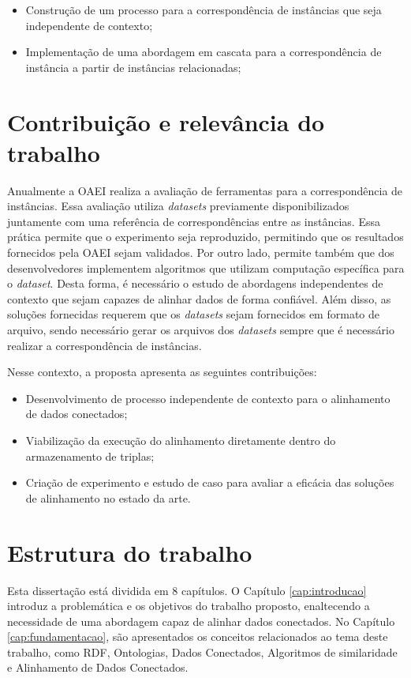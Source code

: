 \begin{itemize}
        \item Construção de um processo para a correspondência de instâncias que seja independente de contexto;
        \item Implementação de uma abordagem em cascata para a correspondência de instância a partir de instâncias relacionadas;
\end{itemize}


\section{Contribuição e relevância do trabalho}
\label{contribuicao}
Anualmente a OAEI realiza a avaliação de ferramentas para a correspondência de instâncias. Essa avaliação utiliza \textit{datasets} previamente disponibilizados juntamente com uma referência de correspondências entre as instâncias. Essa prática permite que o experimento seja reproduzido, permitindo que os resultados fornecidos pela OAEI sejam validados. Por outro lado, permite também que dos desenvolvedores implementem algoritmos que utilizam computação específica para o \textit{dataset}. Desta forma, é necessário o estudo de abordagens independentes de contexto que sejam capazes de alinhar dados de forma confiável. Além disso, as soluções fornecidas requerem que os \textit{datasets} sejam fornecidos em formato de arquivo, sendo necessário gerar os arquivos dos \textit{datasets} sempre que é necessário realizar a correspondência de instâncias.

Nesse contexto, a proposta apresenta as seguintes contribuições:
\begin{itemize}
\item Desenvolvimento de processo independente de contexto para o alinhamento de dados conectados;
\item Viabilização da execução do alinhamento diretamente dentro do armazenamento de triplas;%
\item  Criação de experimento e estudo de caso para avaliar a eficácia das soluções de alinhamento no estado da arte.
\end{itemize}

\section{Estrutura do trabalho}

Esta dissertação está dividida em 8 capítulos. O Capítulo \ref{cap:introducao} introduz a problemática e os objetivos do trabalho proposto, enaltecendo a necessidade de uma abordagem capaz de alinhar dados conectados. No Capítulo \ref{cap:fundamentacao}, são apresentados os conceitos relacionados ao tema deste trabalho, como RDF, Ontologias, Dados Conectados, Algoritmos de similaridade e Alinhamento de Dados Conectados.


